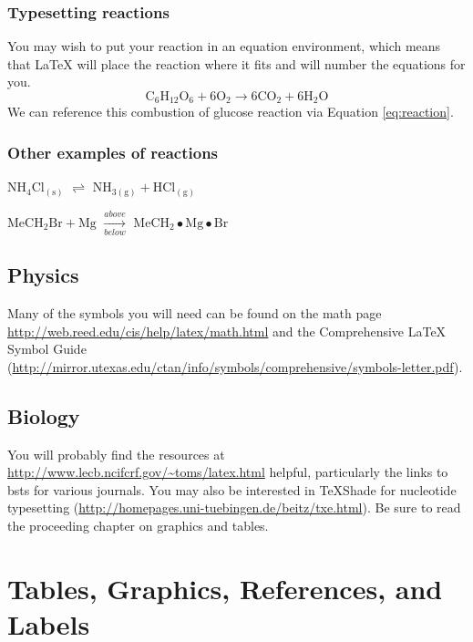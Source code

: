 \documentclass[12pt,twoside]{reedthesis}
\begin{document}
\subsection{Typesetting reactions}\label{typesetting-reactions}

You may wish to put your reaction in an equation environment, which means that LaTeX will place the reaction where it fits and will number the equations for you.
\begin{equation}
  \mathrm{C_6H_{12}O_6  + 6O_2} \longrightarrow \mathrm{6CO_2 + 6H_2O}
  \label{eq:reaction}
\end{equation}
We can reference this combustion of glucose reaction via Equation \eqref{eq:reaction}.

\subsection{Other examples of reactions}\label{other-examples-of-reactions}

\(\mathrm{NH_4Cl_{(s)}}\) \(\rightleftharpoons\) \(\mathrm{NH_{3(g)}+HCl_{(g)}}\)

\noindent \(\mathrm{MeCH_2Br + Mg}\) \(\xrightarrow[below]{above}\) \(\mathrm{MeCH_2\bullet Mg \bullet Br}\)

\section{Physics}\label{physics}

Many of the symbols you will need can be found on the math page \url{http://web.reed.edu/cis/help/latex/math.html} and the Comprehensive LaTeX Symbol Guide (\url{http://mirror.utexas.edu/ctan/info/symbols/comprehensive/symbols-letter.pdf}).

\section{Biology}\label{biology}

You will probably find the resources at \url{http://www.lecb.ncifcrf.gov/~toms/latex.html} helpful, particularly the links to bsts for various journals. You may also be interested in TeXShade for nucleotide typesetting (\url{http://homepages.uni-tuebingen.de/beitz/txe.html}). Be sure to read the proceeding chapter on graphics and tables.

\chapter{Tables, Graphics, References, and Labels}\label{ref-labels}
\end{document}
